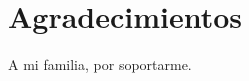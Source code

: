 
\chapter*{Agradecimientos}
\begin{center}
\thispagestyle{empty}
\par\end{center}

A mi familia, por soportarme.


